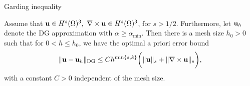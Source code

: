 \documentclass[final,leqno]{siamltex704}
\newcommand{\bn}{{\bf n}}
\def\T{{\mathcal T}}
\def\F{{\mathcal F}}
\def\bn{{\bf n}}
\def\bu{{\bf u}}
\def\ljump{{[\![}}
\def\rjump{{]\!]}}
\def\lavg{{\{\!\{}}
\def\ravg{{\}\!\}}}
\newcommand{\pT}{{\partial T}}
\begin{document}

\begin{theorem}
Garding inequality
\end{theorem}
\begin{theorem}
Assume that $\bu\in H^s(\Omega)^3,\ \nabla\times\bu\in H^s(\Omega)^3$, for $s>1/2$. Furthermore, let $\bu_h$ denote the DG approximation with $\alpha\ge \alpha_{\min}.$ Then there is a mesh size $h_0>0$ such that for $0<h\le h_0$, we have the optimal a priori error bound
\begin{eqnarray}
\|\bu-\bu_h\|_{\text{DG}}\le Ch^{\min\{s,k\}}\bigg(\|\bu\|_s+\|\nabla\times\bu\|_s\bigg),
\end{eqnarray}
with a constant $C>0$ independent of the mesh size.
\end{theorem}
\end{document}

